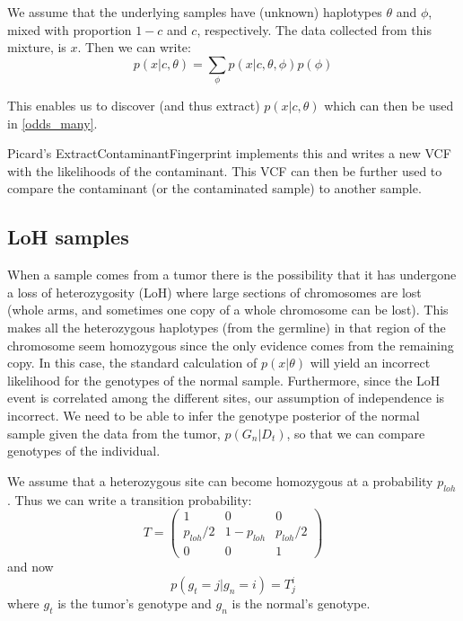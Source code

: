 \documentclass[12pt]{article}
\begin{document}
We assume that the underlying samples have (unknown) haplotypes $\theta$ and $\phi$, mixed with proportion $1-c$ and $c$, respectively. 
The data collected from this mixture, is $x$.
Then we can write: 
\begin{equation}
p(x|c,\theta)=\sum_\phi p(x|c,\theta,\phi)p(\phi)
\end{equation}

This enables us to discover (and thus extract) $p(x|c,\theta)$ which can then be used in \eqref{odds_many}. 

Picard's ExtractContaminantFingerprint implements this and writes a new VCF with the likelihoods of the contaminant. 
This VCF can then be further used to compare the contaminant (or the contaminated sample) to another sample.

\subsection{LoH samples}
When a sample comes from a tumor there is the possibility that it has undergone a loss of heterozygosity (LoH) where large sections of chromosomes are lost (whole arms, and sometimes one copy of a whole chromosome can be lost).
This makes all the heterozygous haplotypes (from the germline) in that region of the chromosome seem homozygous since the only evidence comes from the remaining copy.
In this case, the standard calculation of $p(x|\theta)$ will yield an incorrect likelihood for the genotypes of the normal sample. Furthermore, since the LoH event is correlated among the different sites, our assumption of independence is incorrect.  
We need to be able to infer the genotype posterior of the normal sample given the data from the tumor, $p(G_n|D_t)$,  so that we can compare genotypes of the individual.

We assume that a heterozygous site can become homozygous at a probability $p_{loh}$. Thus we can write a transition probability:
\begin{equation}
T= \begin{pmatrix}
1 & 0 & 0 \\
p_{loh}/2 & 1-p_{loh} & p_{loh}/2\\
0 & 0 & 1
\end{pmatrix}
\end{equation}
and now
\begin{equation}
p(g_t=j|g_n=i) = T^i_j
\end{equation}
where $g_t$ is the tumor's genotype and $g_n$ is the normal's genotype.
\end{document}
